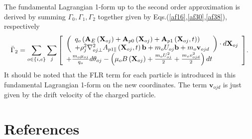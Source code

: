 \documentclass[12pt]{iopart}
\begin{document}
The fundamental Lagrangian 1-form up to the second order approximation is derived by summing $\Gamma_0, \Gamma_1, \Gamma_2$ together given by Eqs.(\ref{af16},\ref{af30},\ref{af38}), respectively
\begin{equation}\label{af39}
{\bar \Gamma _2} = \sum\limits_{o \in \{ i,e\} } {\sum\limits_j {\left[ {\begin{array}{*{20}{l}}
{\left( {\begin{array}{*{20}{l}}
{{q_o}\left( {{{\bf{A}}_E}\left( {{{\bf{X}}_{oj}}} \right) + {{\bf{A}}_{p0}}\left( {{{\bf{X}}_{oj}}} \right) + {{\bf{A}}_{p1}}\left( {{{\bf{X}}_{oj}},t} \right)} \right)}\\
{ + \rho _j^2\nabla _{oj \bot }^2{A_{p1\parallel }}\left( {{{\bf{X}}_{oj}},t} \right){\bf{b}} + {m_o}{U_{oj}}{\bf{b}} + {m_o}{{\bf{v}}_{ojd}}}
\end{array}} \right)\cdot d{{\bf{X}}_{oj}}}\\
{ + \frac{{{m_o}{\mu _{oj}}}}{{{q_o}}}d{\theta _{oj}} - \left( {{\mu _o}B\left( {{{\bf{X}}_{oj}}} \right) + \frac{{{m_o}U_{oj}^2}}{2} + \frac{{{m_o}v_{ojd}^2}}{2}} \right)dt}
\end{array}} \right]} } .
\end{equation}
It should be noted that the FLR term for each particle is introduced in this fundamental Lagrangian 1-form on the new coordinates. The term $\mathbf{v}_{ojd}$ is just given by the drift velocity of the charged particle.



\newpage
\section*{References}



\end{document}
